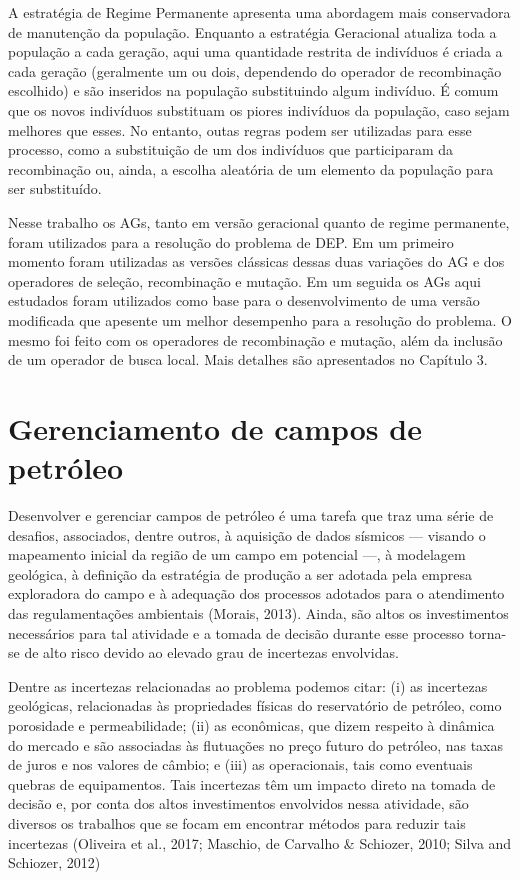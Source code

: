 A estratégia de Regime Permanente apresenta uma abordagem mais conservadora de manutenção da população. Enquanto a estratégia Geracional atualiza toda a população a cada geração, aqui uma quantidade restrita de indivíduos é criada a cada geração (geralmente um ou dois, dependendo do operador de recombinação escolhido) e são inseridos na população substituindo algum indivíduo. É comum que os novos indivíduos substituam os piores indivíduos da população, caso sejam melhores que esses. No entanto, outas regras podem ser utilizadas para esse processo, como a substituição de um dos indivíduos que participaram da recombinação ou, ainda, a escolha aleatória de um elemento da população para ser substituído.

Nesse trabalho os AGs, tanto em versão geracional quanto de regime permanente, foram utilizados para a resolução do problema de DEP.  Em um primeiro momento foram utilizadas as versões clássicas dessas duas variações do AG e dos operadores de seleção, recombinação e mutação. Em um seguida os AGs aqui estudados foram utilizados como base para o desenvolvimento de uma versão modificada que apesente um melhor desempenho para a resolução do problema. O mesmo foi feito com os operadores de recombinação e mutação, além da inclusão de um operador de busca local. Mais detalhes são apresentados no Capítulo 3.

\section{Gerenciamento de campos de petróleo}
\label{sec:section22}
Desenvolver e gerenciar campos de petróleo é uma tarefa que traz uma série de desafios, associados, dentre outros, à aquisição de dados sísmicos — visando o mapeamento inicial da região de um campo em potencial —, à modelagem geológica, à definição da estratégia de produção a ser adotada pela empresa exploradora do campo e à adequação dos processos adotados para o atendimento das regulamentações ambientais (Morais, 2013). Ainda, são altos os investimentos necessários para tal atividade e a tomada de decisão durante esse processo torna-se de alto risco devido ao elevado grau de incertezas envolvidas.

Dentre as incertezas relacionadas ao problema podemos citar: (i) as incertezas geológicas, relacionadas às propriedades físicas do reservatório de petróleo, como porosidade e permeabilidade; (ii) as econômicas, que dizem respeito à dinâmica do mercado e são associadas às flutuações no preço futuro do petróleo, nas taxas de juros e nos valores de câmbio; e (iii) as operacionais, tais como eventuais quebras de equipamentos. Tais incertezas têm um impacto direto na tomada de decisão e, por conta dos altos investimentos envolvidos nessa atividade, são diversos os trabalhos que se focam em encontrar métodos para reduzir tais incertezas (Oliveira et al., 2017; Maschio, de Carvalho \&  Schiozer, 2010; Silva and Schiozer, 2012)

